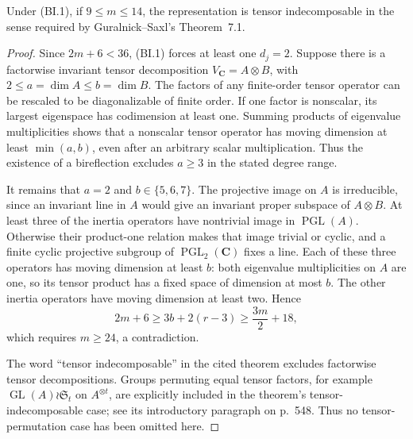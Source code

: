 \begin{lemma}
\label{D-BI-02a}
Under (BI.1), if $9\le m\le14$, the representation is tensor
indecomposable in the sense required by Guralnick--Saxl's
Theorem~7.1.
\end{lemma}
\begin{proof}
Since $2m+6<36$, (BI.1) forces at least one $d_j=2$.
Suppose there is a factorwise invariant tensor decomposition
$V_{\mathbf C}=A\otimes B$, with $2\le a=\dim A\le b=\dim B$.
The factors of any finite-order tensor operator can be rescaled to
be diagonalizable of finite order.  If one factor is nonscalar,
its largest eigenspace has codimension at least one.  Summing
products of eigenvalue multiplicities shows that a nonscalar tensor
operator has moving dimension at least $\min(a,b)$, even after
an arbitrary scalar multiplication.  Thus the existence of a
bireflection excludes $a\ge3$ in the stated degree range.

It remains that $a=2$ and $b\in\{5,6,7\}$.  The projective image
on $A$ is irreducible, since an invariant line in $A$ would give an
invariant proper subspace of $A\otimes B$.  At least three of the
inertia operators have nontrivial image in $\operatorname{PGL}(A)$.
Otherwise their product-one relation makes that image trivial or
cyclic, and a finite cyclic projective subgroup of
$\operatorname{PGL}_2(\mathbf C)$ fixes a line.  Each of these
three operators has moving dimension at least $b$: both eigenvalue
multiplicities on $A$ are one, so its tensor product has a fixed
space of dimension at most $b$.  The other inertia operators have
moving dimension at least two.  Hence
\[
       2m+6\ge3b+2(r-3)\ge\frac{3m}{2}+18,
\]
which requires $m\ge24$, a contradiction.

The word ``tensor indecomposable'' in the cited theorem excludes
factorwise tensor decompositions.  Groups permuting equal tensor
factors, for example $\operatorname{GL}(A)\wr\mathfrak S_t$ on
$A^{\otimes t}$, are explicitly included in the theorem's
tensor-indecomposable case; see its introductory paragraph on
p.~548.  Thus no tensor-permutation case has been omitted here.
\end{proof}

